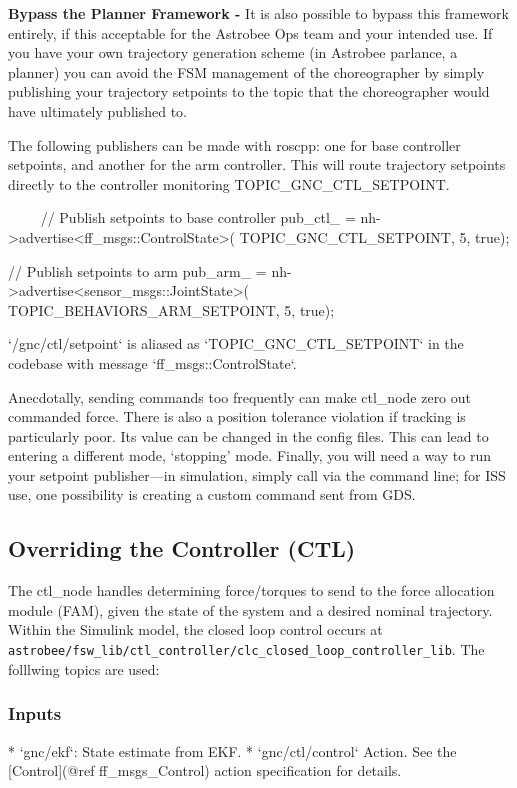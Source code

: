 \documentclass{article}
\begin{document}
\noindent\textbf{Bypass the Planner Framework - } It is also possible to bypass this framework entirely, if this acceptable for the Astrobee Ops team and your intended use. If you have your own trajectory generation scheme (in Astrobee parlance, a planner) you can avoid the FSM management of the choreographer by simply publishing your trajectory setpoints to the topic that the choreographer would have ultimately published to. 

The following publishers can be made with roscpp: one for base controller setpoints, and another for the arm controller. This will route trajectory setpoints directly to the controller monitoring TOPIC\_GNC\_CTL\_SETPOINT.
 
\begin{markdown}
~~~~
//  Publish setpoints to base controller
pub_ctl_ = nh->advertise<ff_msgs::ControlState>(
TOPIC_GNC_CTL_SETPOINT, 5, true);

//  Publish setpoints to arm
pub_arm_ = nh->advertise<sensor_msgs::JointState>(
TOPIC_BEHAVIORS_ARM_SETPOINT, 5, true);
~~~~

`/gnc/ctl/setpoint` is aliased as `TOPIC_GNC_CTL_SETPOINT` in the codebase with message `ff_msgs::ControlState`.
\end{markdown}

Anecdotally, sending commands too frequently can make ctl\_node zero out commanded force. There is also a position tolerance violation if tracking is particularly poor. Its value can be changed in the config files. This can lead to entering a different mode, `stopping' mode. Finally, you will need a way to run your setpoint publisher---in simulation, simply call via the command line; for ISS use, one possibility is creating a custom command sent from GDS.
\\

\subsection{Overriding the Controller (CTL)}

The ctl\_node handles determining force/torques to send to the force allocation module (FAM), given the state of the system and a desired nominal trajectory. Within the Simulink model, the closed loop control occurs at \texttt{astrobee/fsw\_lib/ctl\_controller/clc\_closed\_loop\_controller\_lib}.
The folllwing topics are used:

\subsubsection{Inputs}
\begin{markdown}
* `gnc/ekf`: State estimate from EKF.
* `gnc/ctl/control` Action. See the  [Control](@ref ff_msgs_Control) action specification for details.
\end{markdown}
\end{document}
